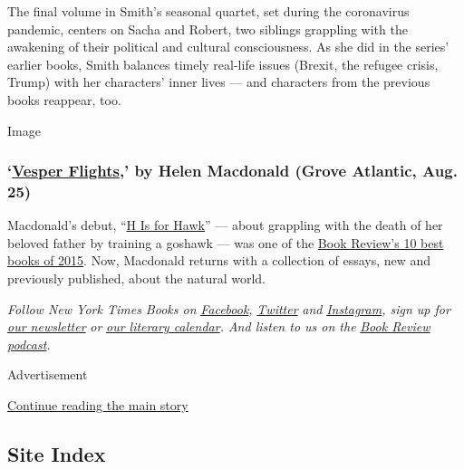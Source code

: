 The final volume in Smith's seasonal quartet, set during the coronavirus
pandemic, centers on Sacha and Robert, two siblings grappling with the
awakening of their political and cultural consciousness. As she did in
the series' earlier books, Smith balances timely real-life issues
(Brexit, the refugee crisis, Trump) with her characters' inner lives ---
and characters from the previous books reappear, too.

Image

\hypertarget{vesper-flights-by-helen-macdonald-grove-atlantic-aug-25}{%
\subsubsection{\texorpdfstring{`\href{https://groveatlantic.com/book/vesper-flights/}{Vesper
Flights},' by Helen Macdonald (Grove Atlantic, Aug.
25)}{`Vesper Flights,' by Helen Macdonald (Grove Atlantic, Aug. 25)}}\label{vesper-flights-by-helen-macdonald-grove-atlantic-aug-25}}

Macdonald's debut,
``\href{https://www.nytimes3xbfgragh.onion/2015/02/22/books/review/helen-macdonalds-h-is-for-hawk.html}{H
Is for Hawk}'' --- about grappling with the death of her beloved father
by training a goshawk --- was one of the
\href{https://www.nytimes3xbfgragh.onion/interactive/2015/12/02/books/review/best-books-of-2015.html}{Book
Review's 10 best books of 2015}. Now, Macdonald returns with a
collection of essays, new and previously published, about the natural
world.

\emph{Follow New York Times Books on}
\href{https://www.facebookcorewwwi.onion/nytbooks/}{\emph{Facebook}}\emph{,}
\href{https://twitter.com/nytimesbooks}{\emph{Twitter}} \emph{and}
\href{https://www.instagram.com/nytbooks/}{\emph{Instagram}}\emph{, sign
up for}
\href{https://www.nytimes3xbfgragh.onion/newsletters/books-review}{\emph{our
newsletter}} \emph{or}
\href{https://www.nytimes3xbfgragh.onion/interactive/2017/books/books-calendar.html}{\emph{our
literary calendar}}\emph{. And listen to us on the}
\href{https://www.nytimes3xbfgragh.onion/column/book-review-podcast}{\emph{Book
Review podcast}}\emph{.}

Advertisement

\protect\hyperlink{after-bottom}{Continue reading the main story}

\hypertarget{site-index}{%
\subsection{Site Index}\label{site-index}}

